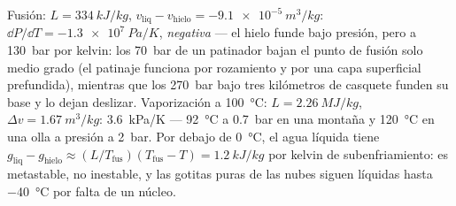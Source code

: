 \begin{example}\label{ex:b2:thermodynamic-potentials:water}
Fusión: $L = \qty{334}{kJ/kg}$, $v_{\text{liq}} - v_{\text{hielo}} = -\qty{9.1e-5}{m^3/kg}$:
$\dd P/\dd T = \qty{-1.3e7}{Pa/K}$, \emph{negativa} --- el hielo funde bajo
presión, pero a \qty{130}{bar} por kelvin: los \qty{70}{bar} de un patinador bajan
el punto de fusión solo medio grado (el patinaje funciona por rozamiento y
por una capa superficial prefundida), mientras que los \qty{270}{bar} bajo tres
kilómetros de casquete funden su base y lo dejan deslizar. Vaporización a
\qty{100}{\celsius}: $L = \qty{2.26}{MJ/kg}$, $\Delta v = \qty{1.67}{m^3/kg}$:
\qty{3.6}{kPa/K} --- \qty{92}{\celsius} a \qty{0.7}{bar} en una montaña y
\qty{120}{\celsius} en una olla a presión a \qty{2}{bar}. Por debajo de
\qty{0}{\celsius}, el agua líquida tiene $g_{\text{liq}} - g_{\text{hielo}} \approx
(L/T_{\text{fus}})(T_{\text{fus}} - T) = \qty{1.2}{kJ/kg}$ por kelvin de
subenfriamiento: es metastable, no inestable, y las gotitas puras de las
nubes siguen líquidas hasta \qty{-40}{\celsius} por falta de un núcleo.
\end{example}

